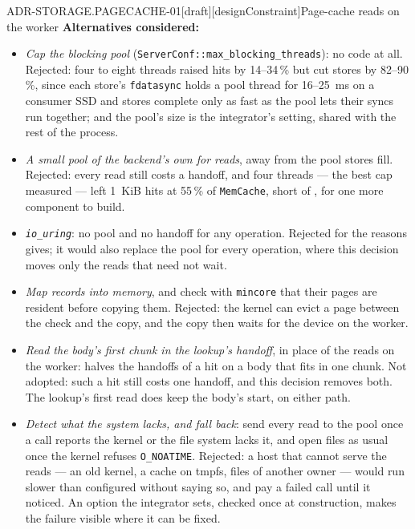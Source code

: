 \begin{requirement}{ADR-STORAGE.PAGECACHE-01}[draft][designConstraint]{Page-cache reads on the worker}
  \textbf{Alternatives considered:}
  \begin{itemize}
    \item \emph{Cap the blocking pool}
      (\texttt{ServerConf::max\_blocking\_threads}): no code at all.
      Rejected: four to eight threads raised hits by 14--34\,\% but cut
      stores by 82--90\,\%, since each store's \texttt{fdatasync} holds a
      pool thread for 16--25~ms on a consumer SSD and stores complete only as
      fast as the pool lets their syncs run together; and the pool's size is
      the integrator's setting, shared with the rest of the process.
    \item \emph{A small pool of the backend's own for reads}, away from the
      pool stores fill. Rejected: every read still costs a handoff, and four
      threads --- the best cap measured --- left 1~KiB hits at 55\,\% of
      \texttt{MemCache}, short of , for
      one more component to build.
    \item \emph{\texttt{io\_uring}}: no pool and no handoff for any
      operation. Rejected for the reasons 
      gives; it would also replace the pool for every operation, where this
      decision moves only the reads that need not wait.
    \item \emph{Map records into memory}, and check with \texttt{mincore}
      that their pages are resident before copying them. Rejected: the kernel
      can evict a page between the check and the copy, and the copy then
      waits for the device on the worker.
    \item \emph{Read the body's first chunk in the lookup's handoff}, in
      place of the reads on the worker: halves the handoffs of a hit on a
      body that fits in one chunk. Not adopted: such a hit still costs one
      handoff, and this decision removes both. The lookup's first read does
      keep the body's start, on either path.
    \item \emph{Detect what the system lacks, and fall back}: send every read
      to the pool once a call reports the kernel or the file system lacks
      it, and open files as usual once the kernel refuses
      \texttt{O\_NOATIME}. Rejected: a host that cannot serve the reads ---
      an old kernel, a cache on tmpfs, files of another owner --- would run
      slower than configured without saying so, and pay a failed call until
      it noticed. An option the integrator sets, checked once at
      construction, makes the failure visible where it can be fixed.
  \end{itemize}


\end{requirement}
